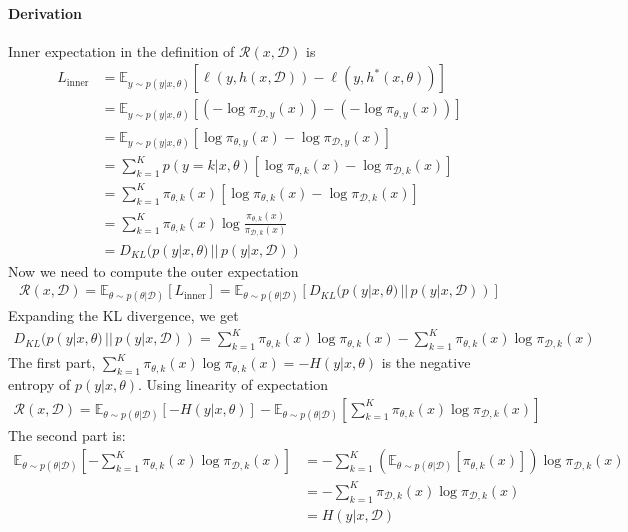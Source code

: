 \paragraph{Derivation}
Inner expectation in the definition of $\mathcal{R}(x, \mathcal{D})$ is
\begin{align}
L_{\text{inner}}&= \mathbb{E}_{y \sim p(y|x, \theta)} \left[ \ell(y,h(x,\mathcal{D})) - \ell(y,h^*(x, \theta)) \right] \nonumber \\
&=\mathbb{E}_{y\sim p(y|x, \theta)} \left[ (-\log \pi_{\mathcal{D},y}(x)) - (-\log \pi_{\theta,y}(x)) \right] \nonumber \\
&=\mathbb{E}_{y\sim p(y|x, \theta)} \left[ \log \pi_{\theta,y}(x) -\log \pi_{\mathcal{D},y}(x) \right] \nonumber \\
&= \sum_{k=1}^K p(y=k|x, \theta) \left[ \log \pi_{\theta,k}(x) - \log \pi_{\mathcal{D},k}(x) \right] \nonumber \\
&= \sum_{k=1}^K \pi_{\theta,k}(x) \left[ \log \pi_{\theta,k}(x) - \log \pi_{\mathcal{D},k}(x) \right]  \nonumber \\
&= \sum_{k=1}^K \pi_{\theta,k}(x) \log \frac{\pi_{\theta,k}(x)}{\pi_{\mathcal{D},k}(x)} \nonumber \\
&= D_{KL}(p(y|x,\theta) \,||\, p(y|x,\mathcal{D}))
\end{align}
Now we need to compute the outer expectation
\begin{align}
\mathcal{R}(x, \mathcal{D}) = \mathbb{E}_{\theta \sim p(\theta|\mathcal{D})} [L_{\text{inner}}] = \mathbb{E}_{\theta \sim p(\theta|\mathcal{D})} \left[ D_{KL}(p(y|x,\theta) \,||\, p(y|x,\mathcal{D})) \right]
\end{align}
Expanding the KL divergence, we get
\begin{align}
D_{KL}(p(y|x,\theta) \,||\, p(y|x,\mathcal{D})) = \sum_{k=1}^K \pi_{\theta,k}(x) \log \pi_{\theta,k}(x) - \sum_{k=1}^K \pi_{\theta,k}(x) \log \pi_{\mathcal{D},k}(x)
\end{align}
The first part, $\sum_{k=1}^K \pi_{\theta,k}(x) \log \pi_{\theta,k}(x) = -H(y|x,\theta)$ is the negative entropy of $p(y|x,\theta)$. Using linearity of expectation
\begin{align}
\mathcal{R}(x, \mathcal{D}) = \mathbb{E}_{\theta \sim p(\theta|\mathcal{D})} [-H(y|x,\theta)] - \mathbb{E}_{\theta \sim p(\theta|\mathcal{D})} \left[ \sum_{k=1}^K \pi_{\theta,k}(x) \log \pi_{\mathcal{D},k}(x) \right]
\end{align}
The second part is:
\begin{align}
\mathbb{E}_{\theta \sim p(\theta|\mathcal{D})} \left[ -\sum_{k=1}^K \pi_{\theta,k}(x) \log \pi_{\mathcal{D},k}(x) \right] &= - \sum_{k=1}^K \left( \mathbb{E}_{\theta \sim p(\theta|\mathcal{D})} [\pi_{\theta,k}(x)] \right) \log \pi_{\mathcal{D},k}(x) \nonumber \\
&= - \sum_{k=1}^K \pi_{\mathcal{D},k}(x) \log \pi_{\mathcal{D},k}(x) \nonumber \\
&= H(y|x,\mathcal{D})
\end{align}
